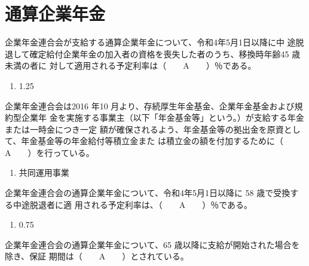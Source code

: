 \section{通算企業年金}

\begin{fillblank}[年金1 2021 問題1(6)\textcircled{2} 改題]
  企業年金連合会が支給する通算企業年金について、令和4年5月1日以降に中
途脱退して確定給付企業年金の加入者の資格を喪失した者のうち、移換時年齢45 歳未満の者に
対して適用される予定利率は（　　A　　）％である。
\end{fillblank}

\begin{answerbox}
  \begin{enumerate}[A: ]
    \item 1.25
  \end{enumerate}
\end{answerbox}

\begin{fillblank}[年金1 2019 問題1(4)\textcircled{2}]
  企業年金連合会は2016 年10 月より、存続厚生年金基金、企業年金基金および規約型企業年
金を実施する事業主（以下「年金基金等」という。）が支給する年金または一時金につき一定
額が確保されるよう、年金基金等の拠出金を原資として、年金基金等の年金給付等積立金また
は積立金の額を付加するために（　　A　　）を行っている。
\end{fillblank}

\begin{answerbox}
  \begin{enumerate}[A: ]
    \item 共同運用事業
  \end{enumerate}
\end{answerbox}

\begin{fillblank}[年金1 2018 問題1(5)\textcircled{1} 改題]
企業年金連合会の通算企業年金について、令和4年5月1日以降に 58 歳で受換する中途脱退者に適
用される予定利率は、（　　A　　）％である。
\end{fillblank}

\begin{answerbox}
  \begin{enumerate}[A: ]
    \item 0.75
  \end{enumerate}
\end{answerbox}

\begin{fillblank}[年金1 2018 問題1(5)\textcircled{2}]
企業年金連合会の通算企業年金について、65 歳以降に支給が開始された場合を除き、保証
期間は（　　A　　）とされている。
\end{fillblank}

